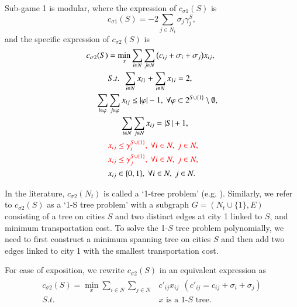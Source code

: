 \documentclass[authoryear,review,12pt]{elsarticle}
\begin{document}
Sub-game 1 is modular, where the expression of $c_{\sigma1}(S)$ is
\begin{equation*}\label{eqn:tssub1}
c_{\sigma1}(S) = - 2\sum_{j \in N_t} \sigma_j\gamma_j^S,
\end{equation*}
and the specific expression of $c_{\sigma2}(S)$ is
\begin{eqnarray*}\label{eqn:tssub2}
\begin{aligned}
c_{\sigma2}(S) &= \min_{x} \sum_{i \in N} \sum_{j \in N} \big(c_{ij} + \sigma_i + \sigma_j \big)x_{ij},\\
&S.t.~~\sum_{i \in N}x_{i1} + \sum_{i \in N}x_{1i} = 2,\\
\sum_{i \in \varphi} &\sum_{j \in \varphi} x_{ij} \leq |\varphi| - 1, ~\forall \varphi \subset 2^{S \cup \{1\}} \setminus \emptyset,\\
&~~~~~~\sum_{i \in N} \sum_{j \in N} x_{ij} = |S|+1,\\
&\textcolor{red}{x_{ij} \leq \gamma_i^{S\cup\{1\}},~\forall i \in N,~ j \in N,}\\
&\textcolor{red}{x_{ij} \leq \gamma_j^{S\cup\{1\}},~\forall i \in N,~ j \in N,}\\
&x_{ij} \in \{0,1\}, ~\forall i \in N, ~j \in N.
\end{aligned}
\end{eqnarray*}

In the literature, $c_{\sigma2}(N_t)$ is called a `1-tree problem' (e.g. \citealt{held1971traveling}).
Similarly, we refer to $c_{\sigma2}(S)$ as a `1-S tree problem' with a subgraph $G=(N_t\cup\{1\},E)$ consisting of a tree on cities $S$ and two distinct edges at city 1 linked to $S$, and minimum transportation cost.
To solve the 1-$S$ tree problem polynomially, we need to first construct a minimum spanning tree on cities $S$ and then add two edges linked to city 1 with the smallest transportation cost.

For ease of exposition, we rewrite $c_{\sigma2}(S)$ in an equivalent expression as
\begin{eqnarray*}\label{eqn:tssub2tree}
\begin{aligned}
c_{\sigma2}(S) = \min_{x} \sum_{i \in N} \sum_{j \in N} &c'_{ij}x_{ij}~~(c'_{ij} = c_{ij} + \sigma_i + \sigma_j)\\
S.t.~~&\text{$x$ is a 1-$S$ tree}.
\end{aligned}
\end{eqnarray*}
\end{document}
